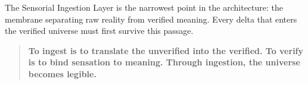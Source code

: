 The Sensorial Ingestion Layer is the narrowest point in the architecture:  
the membrane separating raw reality from verified meaning.  
Every delta that enters the verified universe must first survive this passage.

\bigskip

\begin{quote}
\textbf{
To ingest is to translate the unverified into the verified.  
To verify is to bind sensation to meaning.  
Through ingestion, the universe becomes legible.  
}
\end{quote}

